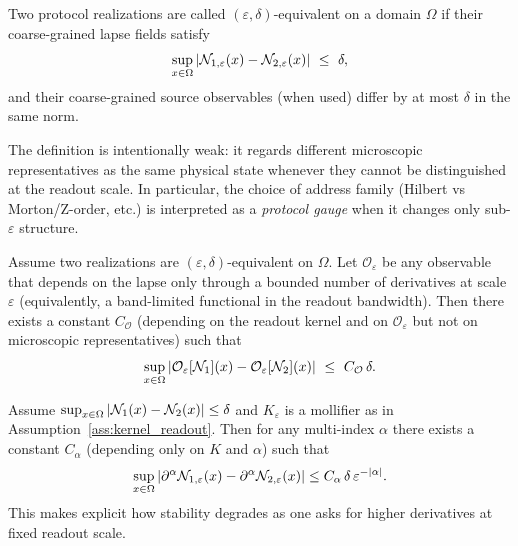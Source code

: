 \begin{definition}
\label{def:eps_delta_equiv}
Two protocol realizations are called $(\varepsilon,\delta)$-equivalent on a domain $\Omega$ if their coarse-grained lapse fields satisfy
\begin{equation}
  \sup_{x\in\Omega}\abs{\lapse_{1,\varepsilon}(x)-\lapse_{2,\varepsilon}(x)}\ \le\ \delta,
\end{equation}
and their coarse-grained source observables (when used) differ by at most $\delta$ in the same norm.
\end{definition}

The definition is intentionally weak: it regards different microscopic representatives as the same physical state whenever they cannot be distinguished at the readout scale.
In particular, the choice of address family (Hilbert vs Morton/Z-order, etc.) is interpreted as a \emph{protocol gauge} when it changes only sub-$\varepsilon$ structure.

\begin{proposition}
\label{prop:bandlimited_universality}
Assume two realizations are $(\varepsilon,\delta)$-equivalent on $\Omega$.
Let $\mathcal{O}_\varepsilon$ be any observable that depends on the lapse only through a bounded number of derivatives at scale $\varepsilon$ (equivalently, a band-limited functional in the readout bandwidth).
Then there exists a constant $C_{\mathcal{O}}$ (depending on the readout kernel and on $\mathcal{O}_\varepsilon$ but not on microscopic representatives) such that
\begin{equation}
  \sup_{x\in\Omega}\abs{\mathcal{O}_\varepsilon[\lapse_1](x)-\mathcal{O}_\varepsilon[\lapse_2](x)}\ \le\ C_{\mathcal{O}}\,\delta.
\end{equation}
\end{proposition}

\begin{corollary}
\label{cor:derivative_stability}
Assume $\sup_{x\in\Omega}\left\lvert \mathcal{N}_1(x)-\mathcal{N}_2(x)\right\rvert\le \delta$ and $K_\varepsilon$ is a mollifier as in Assumption~\ref{ass:kernel_readout}.
Then for any multi-index $\alpha$ there exists a constant $C_\alpha$ (depending only on $K$ and $\alpha$) such that
\begin{equation}
  \sup_{x\in\Omega}\left\lvert \partial^\alpha \mathcal{N}_{1,\varepsilon}(x)-\partial^\alpha \mathcal{N}_{2,\varepsilon}(x)\right\rvert
  \le C_\alpha\,\delta\,\varepsilon^{-|\alpha|}.
\end{equation}
This makes explicit how stability degrades as one asks for higher derivatives at fixed readout scale.
\end{corollary}

